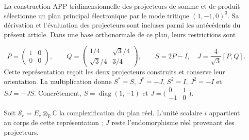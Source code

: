 La construction APP tridimensionnelle des projecteurs de somme et de
produit sélectionne un plan principal électronique par le mode
tritique $(1,-1,0)^3$. Sa dérivation et l’évaluation des
projecteurs sont incluses parmi les antécédents du présent
article. Dans une base orthonormale de ce plan, leurs restrictions
sont

\begin{equation}
 P=\begin{pmatrix}1&0\\0&0\end{pmatrix},\qquad
 Q=\begin{pmatrix}1/4&\sqrt3/4\\\sqrt3/4&3/4\end{pmatrix},
 \qquad S=2P-I,\quad J=\frac4{\sqrt3}[P,Q].
 \label{vi:eq:bloque-electronico}
\end{equation}
Cette représentation reçoit les deux projecteurs construits et
conserve leur orientation. La multiplication donne
$S^*=S$, $J^*=-J$, $S^2=I$, $J^2=-I$ et $SJ=-JS$.
Concrètement, $S=\operatorname{diag}(1,-1)$ et
$J=\bigl(
\begin{smallmatrix}0&1\\-1&0\end{smallmatrix}\bigr)$.

Soit $\mathscr S_e=E_e\otimes_{\mathbb R}\mathbb C$ la
complexification du plan réel. L’unité scalaire $i$ appartient
au corps de cette représentation ; $J$ reste
l’endomorphisme réel provenant des projecteurs.


